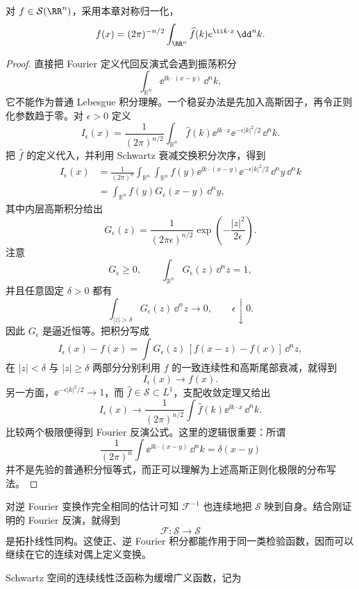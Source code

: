 \begin{theorem}
对 $f\in\mathcal S(\RR^n)$，采用本章对称归一化，
\[
f(x)=(2\pi)^{-n/2}\int_{\RR^n}\widehat f(k)e^{\ii k\cdot x}\,\dd^n k.
\]
\end{theorem}
\begin{proof}
直接把 Fourier 定义代回反演式会遇到振荡积分
\[
\int_{\mathbb R^n}\ee^{\ii k\cdot(x-y)}\,\dd^n k,
\]
它不能作为普通 Lebesgue 积分理解。一个稳妥办法是先加入高斯因子，再令正则化参数趋于零。对 $\epsilon>0$ 定义
\[
I_\epsilon(x)
=\frac1{(2\pi)^{n/2}}
\int_{\mathbb R^n}
\widehat f(k)\ee^{\ii k\cdot x}\ee^{-\epsilon|k|^2/2}\,\dd^n k.
\]
把 $\widehat f$ 的定义代入，并利用 Schwartz 衰减交换积分次序，得到
\[
\begin{aligned}
I_\epsilon(x)
&=\frac1{(2\pi)^n}
\int_{\mathbb R^n}\!\int_{\mathbb R^n}
 f(y)\ee^{\ii k\cdot(x-y)}\ee^{-\epsilon|k|^2/2}
\,\dd^n y\,\dd^n k\\
&=\int_{\mathbb R^n}f(y)G_\epsilon(x-y)\,\dd^n y,
\end{aligned}
\]
其中内层高斯积分给出
\begin{equation*}G_\epsilon(z)
=\frac1{(2\pi\epsilon)^{n/2}}
\exp\!\left(-\frac{|z|^2}{2\epsilon}\right).\end{equation*}
注意
\[
G_\epsilon\ge0,
\qquad
\int_{\mathbb R^n}G_\epsilon(z)\,\dd^n z=1,
\]
并且任意固定 $\delta>0$ 都有
\[
\int_{|z|>\delta}G_\epsilon(z)\,\dd^n z\longrightarrow0,
\qquad \epsilon\downarrow0.
\]
因此 $G_\epsilon$ 是逼近恒等。把积分写成
\[
I_\epsilon(x)-f(x)
=\int G_\epsilon(z)\,[f(x-z)-f(x)]\,\dd^n z,
\]
在 $|z|<\delta$ 与 $|z|\ge\delta$ 两部分分别利用 $f$ 的一致连续性和高斯尾部衰减，就得到
\[
I_\epsilon(x)\longrightarrow f(x).
\]
另一方面，$\ee^{-\epsilon|k|^2/2}\to1$，而 $\widehat f\in\mathcal S\subset L^1$，支配收敛定理又给出
\[
I_\epsilon(x)
\longrightarrow
\frac1{(2\pi)^{n/2}}
\int\widehat f(k)\ee^{\ii k\cdot x}\,\dd^n k.
\]
比较两个极限便得到 Fourier 反演公式。这里的逻辑很重要：所谓
\[
\frac1{(2\pi)^n}\int \ee^{\ii k\cdot(x-y)}\,\dd^n k
=\delta(x-y)
\]
并不是先验的普通积分恒等式，而正可以理解为上述高斯正则化极限的分布写法。

\end{proof}

对逆 Fourier 变换作完全相同的估计可知 $\mathcal F^{-1}$ 也连续地把 $\mathcal S$ 映到自身。结合刚证明的 Fourier 反演，就得到
\[
\mathcal F:\mathcal S\longrightarrow\mathcal S
\]
是拓扑线性同构。这使正、逆 Fourier 积分都能作用于同一类检验函数，因而可以继续在它的连续对偶上定义变换。

Schwartz 空间的连续线性泛函称为缓增广义函数，记为

